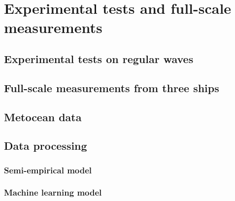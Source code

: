 
\chapter{Experimental tests and full-scale measurements}
\label{chapter:methodology}


\section{Experimental tests on regular waves}
\label{Regularwave}


\section{Full-scale measurements from three ships}
\label{Full}

\section{Metocean data}

\section{Data processing}
\subsection{Semi-empirical model}

\subsection{Machine learning model}

